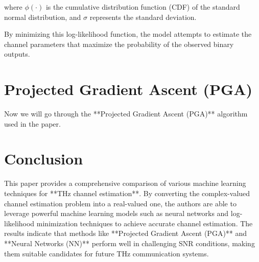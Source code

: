 \documentclass{article}
\begin{document}
where \( \phi(\cdot) \) is the cumulative distribution function (CDF) of the standard normal distribution, and \( \sigma \) represents the standard deviation.

By minimizing this log-likelihood function, the model attempts to estimate the channel parameters that maximize the probability of the observed binary outputs.

\section{Projected Gradient Ascent (PGA)}
Now we will go through the **Projected Gradient Ascent (PGA)** algorithm used in the paper. 

\section{Conclusion}

This paper provides a comprehensive comparison of various machine learning techniques for **THz channel estimation**. By converting the complex-valued channel estimation problem into a real-valued one, the authors are able to leverage powerful machine learning models such as neural networks and log-likelihood minimization techniques to achieve accurate channel estimation. The results indicate that methods like **Projected Gradient Ascent (PGA)** and **Neural Networks (NN)** perform well in challenging SNR conditions, making them suitable candidates for future THz communication systems.
\end{document}
